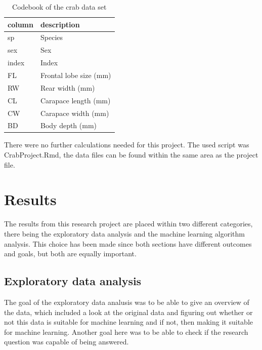 \documentclass[
]{article}
\begin{document}
\begin{table}[!h]

\caption{\label{tab:Reading data}Codebook of the crab data set}
\centering
\fontsize{10}{12}\selectfont
\begin{tabular}[t]{l|l}
\hline
column & description\\
\hline
sp & Species\\
\hline
sex & Sex\\
\hline
index & Index\\
\hline
FL & Frontal lobe size (mm)\\
\hline
RW & Rear width (mm)\\
\hline
CL & Carapace length (mm)\\
\hline
CW & Carapace width (mm)\\
\hline
BD & Body depth (mm)\\
\hline
\end{tabular}
\end{table}

There were no further calculations needed for this project. The used
script was CrabProject.Rmd, the data files can be found within the same
area as the project file.

\newpage

\hypertarget{results}{%
\section{Results}\label{results}}

The results from this research project are placed within two different
categories, there being the exploratory data analysis and the machine
learning algorithm analysis. This choice has been made since both
sections have different outcomes and goals, but both are equally
important.

\hypertarget{exploratory-data-analysis}{%
\subsection{Exploratory data analysis}\label{exploratory-data-analysis}}

The goal of the exploratory data analusis was to be able to give an
overview of the data, which included a look at the original data and
figuring out whether or not this data is suitable for machine learning
and if not, then making it suitable for machine learning. Another goal
here was to be able to check if the research question was capable of
being answered.
\end{document}
